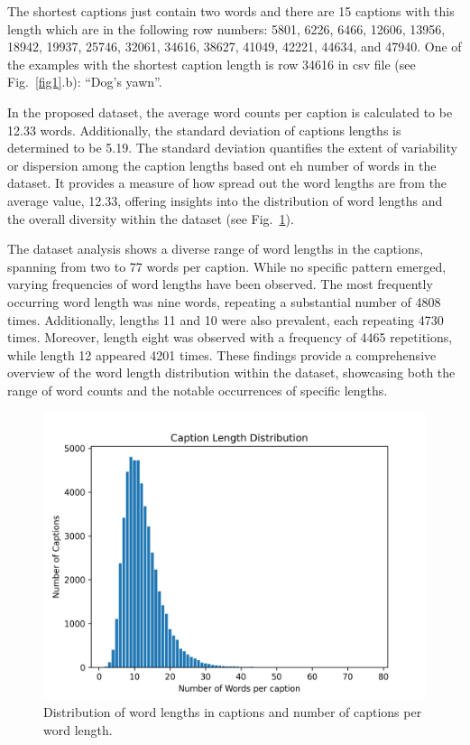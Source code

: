 \documentclass[lettersize,journal]{IEEEtran}
\begin{document}
The shortest captions just contain two words and there are 15 captions with this length which are in the following row numbers: 5801, 6226, 6466, 12606, 13956, 18942, 19937, 25746, 32061, 34616, 38627, 41049, 42221, 44634, and 47940. One of the examples with the shortest caption length is row 34616 in csv file (see Fig.~\ref{fig1}.b): ``Dog's yawn''.

In the proposed dataset, the average word counts per caption is calculated to be 12.33 words. Additionally, the standard deviation of captions lengths is determined to be 5.19. The standard deviation quantifies the extent of variability or dispersion among the caption lengths based ont eh number of words in the dataset. It provides a measure of how spread out the word lengths are from the average value, 12.33, offering insights into the distribution of word lengths and the overall diversity within the dataset (see Fig.~\ref{fig2}).

The dataset analysis shows a diverse range of word lengths in the captions, spanning from two to 77 words per caption. While no specific pattern emerged, varying frequencies of word lengths have been observed. The most frequently occurring word length was nine words, repeating a substantial number of 4808 times. Additionally, lengths 11 and 10 were also prevalent, each repeating 4730 times. Moreover, length eight was observed with a frequency of 4465 repetitions, while length 12 appeared 4201 times. These findings provide a comprehensive overview of the word length distribution within the dataset, showcasing both the range of word counts and the notable occurrences of specific lengths.

\begin{figure}
  \begin{center}
    \includegraphics[width=\columnwidth]{length_distribution.png}
    \caption{Distribution of word lengths in captions and number of captions per word length.}
    \label{fig2}
  \end{center}
\end{figure}
\end{document}
